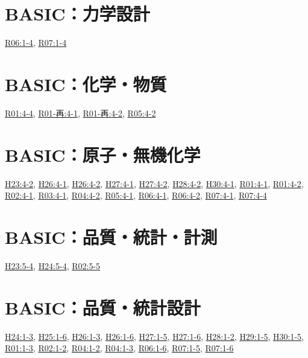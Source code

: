 \section{BASIC：力学設計}
\hyperref[q:r06-reg-basic-1-4]{R06:1-4}, \hyperref[q:r07-reg-basic-1-4]{R07:1-4}
\section{BASIC：化学・物質}
\hyperref[q:r01-reg-basic-4-4]{R01:4-4}, \hyperref[q:r01-ret-basic-4-1]{R01-再:4-1}, \hyperref[q:r01-ret-basic-4-2]{R01-再:4-2}, \hyperref[q:r05-reg-basic-4-2]{R05:4-2}
\section{BASIC：原子・無機化学}
\hyperref[q:h23-reg-basic-4-2]{H23:4-2}, \hyperref[q:h26-reg-basic-4-1]{H26:4-1}, \hyperref[q:h26-reg-basic-4-2]{H26:4-2}, \hyperref[q:h27-reg-basic-4-1]{H27:4-1}, \hyperref[q:h27-reg-basic-4-2]{H27:4-2}, \hyperref[q:h28-reg-basic-4-2]{H28:4-2}, \hyperref[q:h30-reg-basic-4-1]{H30:4-1}, \hyperref[q:r01-reg-basic-4-1]{R01:4-1}, \hyperref[q:r01-reg-basic-4-2]{R01:4-2}, \hyperref[q:r02-reg-basic-4-1]{R02:4-1}, \hyperref[q:r03-reg-basic-4-1]{R03:4-1}, \hyperref[q:r04-reg-basic-4-2]{R04:4-2}, \hyperref[q:r05-reg-basic-4-1]{R05:4-1}, \hyperref[q:r06-reg-basic-4-1]{R06:4-1}, \hyperref[q:r06-reg-basic-4-2]{R06:4-2}, \hyperref[q:r07-reg-basic-4-1]{R07:4-1}, \hyperref[q:r07-reg-basic-4-4]{R07:4-4}
\section{BASIC：品質・統計・計測}
\hyperref[q:h23-reg-basic-5-4]{H23:5-4}, \hyperref[q:h24-reg-basic-5-4]{H24:5-4}, \hyperref[q:r02-reg-basic-5-5]{R02:5-5}
\section{BASIC：品質・統計設計}
\hyperref[q:h24-reg-basic-1-3]{H24:1-3}, \hyperref[q:h25-reg-basic-1-6]{H25:1-6}, \hyperref[q:h26-reg-basic-1-3]{H26:1-3}, \hyperref[q:h26-reg-basic-1-6]{H26:1-6}, \hyperref[q:h27-reg-basic-1-5]{H27:1-5}, \hyperref[q:h27-reg-basic-1-6]{H27:1-6}, \hyperref[q:h28-reg-basic-1-2]{H28:1-2}, \hyperref[q:h29-reg-basic-1-5]{H29:1-5}, \hyperref[q:h30-reg-basic-1-5]{H30:1-5}, \hyperref[q:r01-reg-basic-1-3]{R01:1-3}, \hyperref[q:r02-reg-basic-1-2]{R02:1-2}, \hyperref[q:r04-reg-basic-1-2]{R04:1-2}, \hyperref[q:r04-reg-basic-1-3]{R04:1-3}, \hyperref[q:r06-reg-basic-1-6]{R06:1-6}, \hyperref[q:r07-reg-basic-1-5]{R07:1-5}, \hyperref[q:r07-reg-basic-1-6]{R07:1-6}
